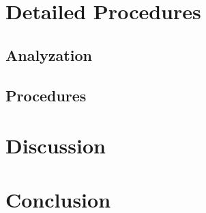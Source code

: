 \section{Detailed Procedures}
    \subsection{Analyzation}


    \subsection{Procedures}

    
\section{Discussion}


\section{Conclusion}